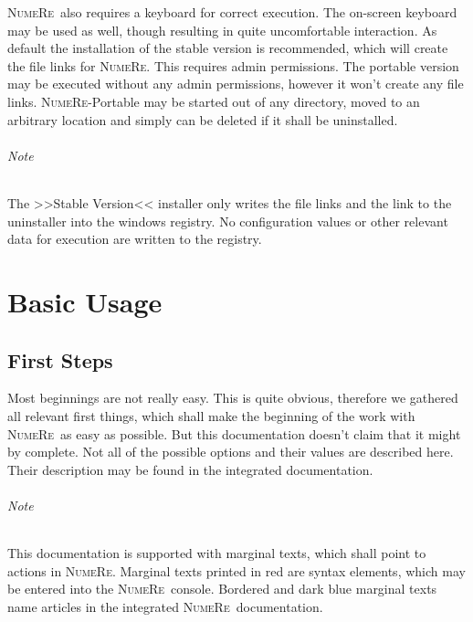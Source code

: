 \documentclass[DIV=14,headsepline,footsepline]{scrbook}
\newcommand{\NR}{\textsc{Nu\-me\-Re}}
\begin{document}
			\NR\ also requires a keyboard for correct execution. The on-screen keyboard may be used as well, though resulting in quite uncomfortable interaction.
			As default the installation of the stable version is recommended, which will create the file links for \NR. This requires admin permissions. The portable version may be executed without any admin permissions, however it won't create any file links. \NR-Portable may be started out of any directory, moved to an arbitrary location and simply can be deleted if it shall be uninstalled.
			\paragraph{Note}
				The >>Stable Version<< installer only writes the file links and the link to the uninstaller into the windows registry. No configuration values or other relevant data for execution are written to the registry.
	\part{Basic Usage}
		\chapter{First Steps}
			Most beginnings are not really easy. This is quite obvious, therefore we gathered all relevant first things, which shall make the beginning of the work with \NR\ as easy as possible. But this documentation doesn't claim that it might by complete. Not all of the possible options and their values are described here. Their description may be found in the integrated documentation.
			\paragraph{Note}
				This documentation is supported with marginal texts, which shall point to actions in \NR. Marginal texts printed in red are syntax elements, which may be entered into the \NR\ console. Bordered and dark blue marginal texts name articles in the integrated \NR\ documentation.
\end{document}
